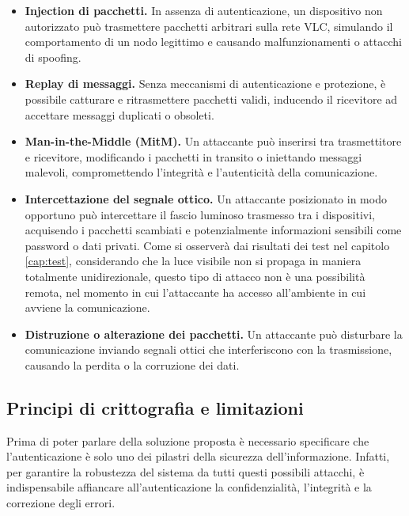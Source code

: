 \begin{itemize}
    \item \textbf{Injection di pacchetti.} In assenza di autenticazione, un dispositivo non autorizzato può trasmettere pacchetti arbitrari sulla rete VLC, simulando il comportamento di un nodo legittimo e causando malfunzionamenti o attacchi di spoofing.
    \item \textbf{Replay di messaggi.} Senza meccanismi di autenticazione e protezione, è possibile catturare e ritrasmettere pacchetti validi, inducendo il ricevitore ad accettare messaggi duplicati o obsoleti.
    \item \textbf{Man-in-the-Middle (MitM).} Un attaccante può inserirsi tra trasmettitore e ricevitore, modificando i pacchetti in transito o iniettando messaggi malevoli, compromettendo l'integrità e l'autenticità della comunicazione.
    \item \textbf{Intercettazione del segnale ottico.} Un attaccante posizionato in modo opportuno può intercettare il fascio luminoso trasmesso tra i dispositivi, acquisendo i pacchetti scambiati e potenzialmente informazioni sensibili come password o dati privati. Come si osserverà dai risultati dei test nel capitolo \ref{cap:test}, considerando che la luce visibile non si propaga in maniera totalmente unidirezionale, questo tipo di attacco non è una possibilità remota, nel momento in cui l'attaccante ha accesso all'ambiente in cui avviene la comunicazione.
    \item \textbf{Distruzione o alterazione dei pacchetti.} Un attaccante può disturbare la comunicazione inviando segnali ottici che interferiscono con la trasmissione, causando la perdita o la corruzione dei dati.
\end{itemize}

\subsection{Principi di crittografia e limitazioni}
Prima di poter parlare della soluzione proposta è necessario specificare che l'autenticazione è solo uno dei pilastri della sicurezza dell'informazione. Infatti, per garantire la robustezza del sistema da tutti questi possibili attacchi, è indispensabile affiancare all'autenticazione la confidenzialità, l'integrità e la correzione degli errori.

